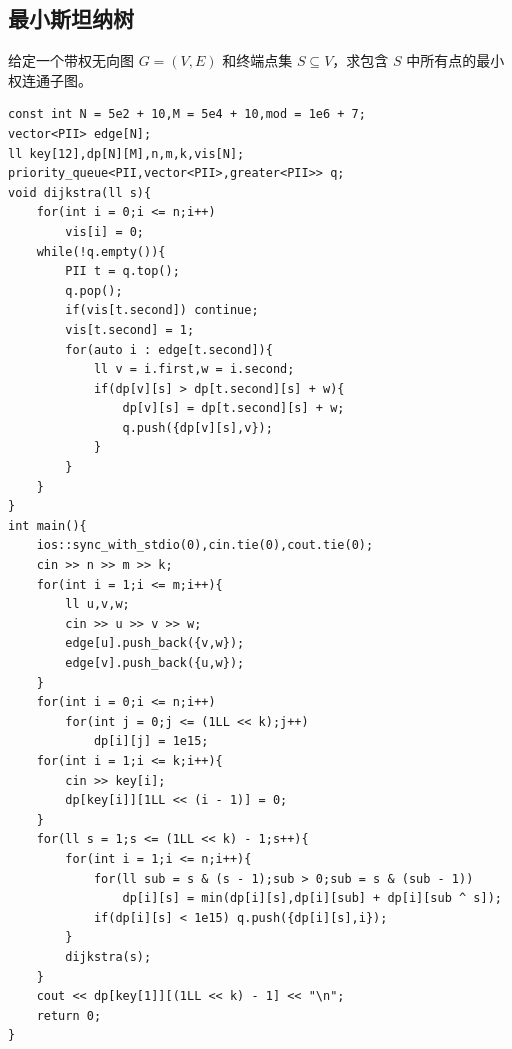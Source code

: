 \subsection{最小斯坦纳树}
给定一个带权无向图 $G=(V,E)$ 和终端点集 $S \subseteq V$，求包含 $S$ 中所有点的最小权连通子图。
\begin{lstlisting}[caption={}]
const int N = 5e2 + 10,M = 5e4 + 10,mod = 1e6 + 7;
vector<PII> edge[N];
ll key[12],dp[N][M],n,m,k,vis[N];
priority_queue<PII,vector<PII>,greater<PII>> q;
void dijkstra(ll s){
	for(int i = 0;i <= n;i++)
		vis[i] = 0;	
	while(!q.empty()){
		PII t = q.top();
		q.pop();
		if(vis[t.second]) continue;
		vis[t.second] = 1;
		for(auto i : edge[t.second]){
			ll v = i.first,w = i.second;
			if(dp[v][s] > dp[t.second][s] + w){
				dp[v][s] = dp[t.second][s] + w;
				q.push({dp[v][s],v});
			}
		}
	}
}
int main(){
	ios::sync_with_stdio(0),cin.tie(0),cout.tie(0);
    cin >> n >> m >> k;
	for(int i = 1;i <= m;i++){
		ll u,v,w;
		cin >> u >> v >> w;
		edge[u].push_back({v,w});
		edge[v].push_back({u,w});
	}
	for(int i = 0;i <= n;i++)
		for(int j = 0;j <= (1LL << k);j++)
			dp[i][j] = 1e15;
	for(int i = 1;i <= k;i++){
		cin >> key[i];
		dp[key[i]][1LL << (i - 1)] = 0; 
	}
	for(ll s = 1;s <= (1LL << k) - 1;s++){
		for(int i = 1;i <= n;i++){
			for(ll sub = s & (s - 1);sub > 0;sub = s & (sub - 1))
				dp[i][s] = min(dp[i][s],dp[i][sub] + dp[i][sub ^ s]); 
			if(dp[i][s] < 1e15) q.push({dp[i][s],i});
		}
		dijkstra(s);
	}
	cout << dp[key[1]][(1LL << k) - 1] << "\n";
	return 0;
}
\end{lstlisting}